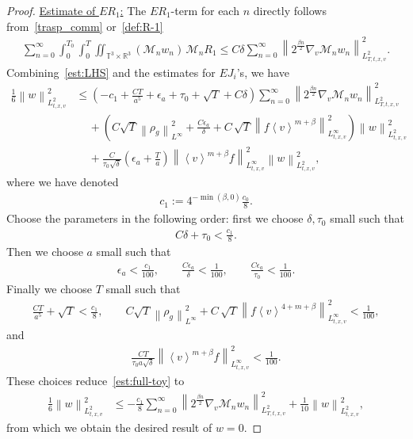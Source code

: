 \documentclass[11pt,american, reqno]{amsart}
\numberwithin{equation}{section}
\newcommand{\R}{\mathbb R}
\newcommand{\1}{\mathds{1}}
\newcommand{\Ni}{\noindent}
\newcommand{\CalM}{\mathcal{M}}
\newcommand{\vpran}[1]{\left(#1\right)}
\newcommand{\nn}{\nonumber}
\newcommand{\Eps}{\epsilon}
\newcommand{\norm}[1]{\left\lVert#1\right\rVert}
\newcommand{\vint}[1]{\left\langle#1\right\rangle}
\newcommand{\T}{\mathbb{T}}
\numberwithin{equation}{section}
\begin{document}
\begin{proof}
\Ni \underline{Estimate of $ER_1$:} The $ER_1$-term for each $n$ directly follows from~\eqref{trasp_comm} or~\eqref{def:R-1}
\begin{align} \label{est:ER-1}
 \sum_{n=0}^\infty
 \int_0^{T_0} \int_0^T \iint_{\T^3 \times \R^3}
   \vpran{\CalM_n w_n} \,
   \CalM_n R_1
\leq 
 C \delta 
\sum_{n=0}^\infty
\norm{2^{\frac{\beta n}{2}} \nabla_v \CalM_n w_n}_{L^2_{T,t,x,v}}^2.
\end{align}
Combining~\eqref{est:LHS} and the estimates for $EJ_i$'s, we have
\begin{align} \label{est:full-toy}
 \frac{1}{6} \norm{w}_{L^2_{t,x,v}}^2
&\leq
 \vpran{- c_1
 + \frac{CT}{a^5}
 + \Eps_a
 + \tau_0
 + \sqrt{T}
 + C \delta} 
 \sum_{n=0}^\infty
 \norm{2^{\frac{\beta n}{2}} \nabla_v \CalM_n w_n}_{L^2_{T,t,x,v}}^2 \nn
\\
& \quad \,
 + \vpran{C \sqrt{T} \norm{\rho_g}_{L^\infty}^2
 + \frac{C \Eps_a}{\delta}
 + C \, \sqrt{T} 
 \norm{f \vint{v}^{m+\beta}}_{L^\infty_{t,x,v}}^2} \norm{w}_{L^2_{t,x,v}}^2 \nn
\\
& \quad \,
 +\frac{C}{\tau_0 \sqrt{\delta}}
  \vpran{\Eps_a + \frac{T}{a}} \norm{\vint{v}^{m+\beta} f}_{L^\infty_{t,x,v}}^2
\norm{w}_{L^2_{t,x,v}}^2,
\end{align}
where we have denoted
\begin{align*}
 c_1 := 4^{-\min(\beta, 0)} \frac{c_0}{8}. 
\end{align*}
Choose the parameters in the following order: first we choose $\delta, \tau_0$ small such that 
\begin{align*}
 C\delta + \tau_0 < \frac{c_1}{8}.
\end{align*}
Then we choose $a$ small such that 
\begin{align*}
  \Eps_a < \frac{c_1}{100}, 
\qquad
  \frac{C\Eps_a}{\delta}
< \frac{1}{100},
\qquad
  \frac{C\Eps_a}{\tau_0}
< \frac{1}{100}.
\end{align*}
Finally we choose $T$ small such that
\begin{align*}
 \frac{CT}{a^5} + \sqrt{T} < \frac{c_1}{8},
\qquad
 C \sqrt{T} \norm{\rho_g}_{L^\infty}^2
 + C \, \sqrt{T} 
 \norm{f \vint{v}^{4+m+\beta}}_{L^\infty_{t,x,v}}^2
< \frac{1}{100},
\end{align*}
and
\begin{align*}
 \frac{CT}{\tau_0 a \sqrt{\delta}}
 \norm{\vint{v}^{m+\beta} f}_{L^\infty_{t,x,v}}^2
< \frac{1}{100}.
\end{align*}
These choices reduce~\eqref{est:full-toy} to
\begin{align*}
 \frac{1}{6} \norm{w}_{L^2_{t,x,v}}^2
&\leq
 -\frac{c_1}{8} 
 \sum_{n=0}^\infty
 \norm{2^{\frac{\beta n}{2}} \nabla_v \CalM_n w_n}_{L^2_{T,t,x,v}}^2
 + \frac{1}{10} \norm{w}_{L^2_{t,x,v}}^2,
\end{align*}
from which we obtain the desired result of $w = 0$.
\end{proof}
\end{document}
